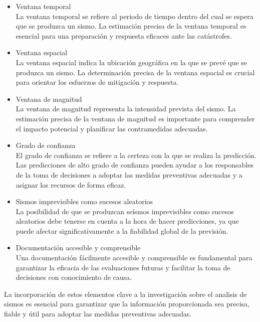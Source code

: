   
\begin{itemize}
    \item Ventana temporal \\
La ventana temporal se refiere al periodo de tiempo dentro del cual se espera que se produzca un sismo. La estimación precisa de la ventana temporal es esencial para una preparación y respuesta eficaces ante las catástrofes. 

    \item Ventana espacial \\
La ventana espacial indica la ubicación geográfica en la que se prevé que se produzca un sismo. La determinación precisa de la ventana espacial es crucial para orientar los esfuerzos de mitigación y respuesta. 

    \item Ventana de magnitud \\
La ventana de magnitud representa la intensidad prevista del sismo. La estimación precisa de la ventana de magnitud es importante para comprender el impacto potencial y planificar las contramedidas adecuadas. 

    \item Grado de confianza \\
El grado de confianza se refiere a la certeza con la que se realiza la predicción. Las predicciones de alto grado de confianza pueden ayudar a los responsables de la toma de decisiones a adoptar las medidas preventivas adecuadas y a asignar los recursos de forma eficaz. 

\item Sismos imprevisibles como sucesos aleatorios \\
La posibilidad de que se produzcan seísmos imprevisibles como sucesos aleatorios debe tenerse en cuenta a la hora de hacer predicciones, ya que puede afectar significativamente a la fiabilidad global de la previsión. 

\item Documentación accesible y comprensible \\
Una documentación fácilmente accesible y comprensible es fundamental para garantizar la eficacia de las evaluaciones futuras y facilitar la toma de decisiones con conocimiento de causa. 
\end{itemize}

La incorporación de estos elementos clave a la investigación sobre el analisis de sismos es esencial para garantizar que la información proporcionada sea precisa, fiable y útil para adoptar las medidas preventivas adecuadas. 
\clearpage